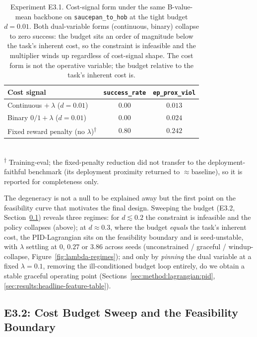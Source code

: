\documentclass[11pt,a4paper]{report}
\begin{document}
\begin{table}[h]
\centering
\caption{Experiment E3.1. Cost-signal form under the same
B-value-mean backbone on \texttt{saucepan\_to\_hob} at the tight
budget $d = 0.01$. Both dual-variable forms (continuous, binary)
collapse to zero success: the budget sits an order of magnitude below
the task's inherent cost, so the constraint is infeasible and the
multiplier winds up regardless of cost-signal shape. The cost form is
not the operative variable; the budget relative to the task's inherent
cost is.}
\label{tab:e3.1-cost-signal}
\small
\begin{tabular}{lcc}
\toprule
Cost signal & \texttt{success\_rate} & \texttt{ep\_prox\_viol} \\
\midrule
Continuous $+\ \lambda$ ($d{=}0.01$)   & $0.00$ & $0.013$ \\
Binary $0/1 + \lambda$ ($d{=}0.01$)    & $0.00$ & $0.024$ \\
Fixed reward penalty (no $\lambda$)\textsuperscript{$\dagger$}    & $0.80$ & $0.242$ \\
\bottomrule
\end{tabular}\\
\footnotesize\textsuperscript{$\dagger$} Training-eval; the
fixed-penalty reduction did not transfer to the deployment-faithful
benchmark (its deployment proximity returned to $\approx$baseline), so
it is reported for completeness only.
\end{table}

The degeneracy is not a null to be explained away but the first point
on the feasibility curve that motivates the final design. Sweeping the
budget (E3.2, Section~\ref{sec:results:budget}) reveals three regimes:
for $d \lesssim 0.2$ the constraint is infeasible and the policy
collapses (above); at $d \approx 0.3$, where the budget \emph{equals}
the task's inherent cost, the PID-Lagrangian sits on the feasibility
boundary and is seed-unstable, with $\lambda$ settling at $0$, $0.27$
or $3.86$ across seeds (unconstrained / graceful / windup-collapse,
Figure~\ref{fig:lambda-regimes}); and only by \emph{pinning} the dual
variable at a fixed $\lambda = 0.1$, removing the ill-conditioned
budget loop entirely, do we obtain a stable graceful operating point
(Sections~\ref{sec:method:lagrangian:pid},
\ref{sec:results:headline-feature-table}).

\subsection{E3.2: Cost Budget Sweep and the Feasibility Boundary}
\label{sec:results:budget}
\end{document}
